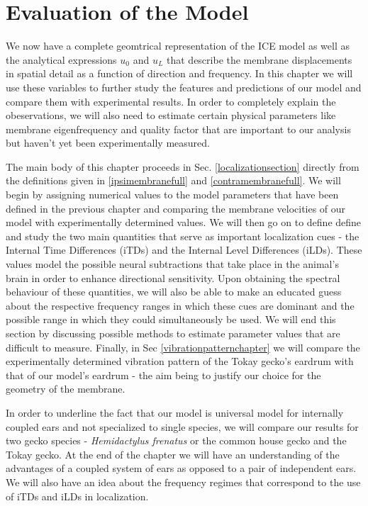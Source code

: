 \chapter{Evaluation of the Model}\label{modelanalysis}
We now have a complete geomtrical representation of the ICE model as well as
 the analytical expressions $u_0$ and $u_L$ that describe the membrane displacements
in spatial detail as a function of direction and frequency. In this chapter we will use these variables
to further study the features and predictions of our model and compare them with experimental results. In
order to completely explain the obeservations, we will also need to estimate certain physical parameters
like membrane eigenfrequency and quality factor that are important to our analysis but haven't yet been
experimentally measured.

The main body of this chapter proceeds in Sec. \ref{localizationsection} directly from the definitions given in \eqref{ipsimembranefull}
and \eqref{contramembranefull}. We will begin by assigning numerical values to the model parameters that have been defined
in the previous chapter and comparing the membrane velocities of our model with experimentally determined values. 
We will then go on to define define and study the two main quantities that serve as important localization
cues - the Internal Time Differences (iTDs) and the Internal Level Differences (iLDs). 
These values model the 
possible neural subtractions that take place in the animal's brain in order to enhance directional sensitivity. Upon obtaining 
the spectral behaviour of these quantities, we will also be able to make an educated guess about
the respective frequency ranges in which these cues are dominant and the possible range in which they could simultaneously
be used. 
We will end this section
by discussing possible methods to estimate parameter values that are difficult to measure.
Finally, in Sec \ref{vibrationpatternchapter} we will compare the experimentally determined vibration pattern
of the Tokay gecko's eardrum with that of our model's eardrum - the aim being to justify our choice for the
geometry of the membrane.

In order to underline the fact that our model is universal model for internally coupled ears and not
specialized to single species, we will compare our results for two gecko species - \emph{Hemidactylus frenatus}
or the common house gecko and the Tokay gecko. At the end of the chapter we will have an understanding of the advantages of a coupled system of ears as opposed
to a pair of independent ears. We will also have an idea about the frequency regimes that correspond to the use
of iTDs and iLDs in localization.

